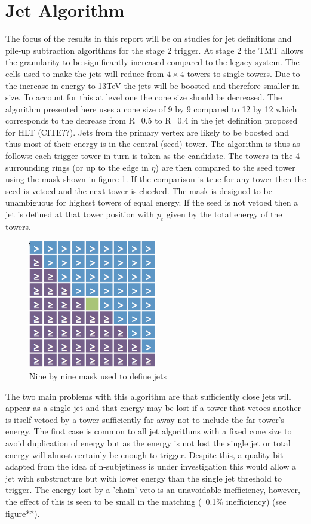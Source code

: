 \section{Jet Algorithm}
The focus of the results in this report will be on studies for jet definitions and pile-up subtraction algorithms for the stage 2 trigger. At stage 2 the TMT allows the granularity to be significantly increased compared to the legacy system. The cells used to make the jets will reduce from $4\times4$ towers to single towers. Due to the increase in energy to 13TeV the jets will be boosted and therefore smaller in size. To account for this at level one the cone size should be decreased. The algorithm presented here uses a cone size of 9 by 9 compared to 12 by 12 which corresponds to the decrease from R=0.5 to R=0.4 in the jet definition proposed for HLT (CITE??). Jets from the primary vertex are likely to be boosted and thus most of their energy is in the central (seed) tower. The algorithm is thus as follows: each trigger tower in turn is taken as the candidate. The towers in the 4 surrounding rings (or up to the edge in $\eta$) are then compared to the seed tower using the mask shown in figure \ref{mask}. If the comparison is true for any tower then the seed is vetoed and the next tower is checked. The mask is designed to be unambiguous for highest towers of equal energy. If the seed is not vetoed then a jet is defined at that tower position with $p_t$ given by the total energy of the towers.    
\begin{figure}
\centering
    \includegraphics[width=0.5\textwidth]{Figures/mask.png}
  \caption{Nine by nine mask used to define jets}
  \label{mask}
\end{figure}
\newpage
The two main problems with this algorithm are that sufficiently close jets will appear as a single jet and that energy may be lost if a tower that vetoes another is itself vetoed by a tower sufficiently far away not to include the far tower's energy. The first case is common to all jet algorithms with a fixed cone size to avoid duplication of energy but as the energy is not lost the single jet or total energy will almost certainly be enough to trigger. Despite this, a quality bit adapted from the idea of n-subjetiness \cite{nsub} is under investigation this would allow a jet with substructure but with lower energy than the single jet threshold to trigger. The energy lost by a 'chain' veto is an unavoidable inefficiency, however, the effect of this is seen to be small in the matching (~0.1\% inefficiency) (see figure**).

